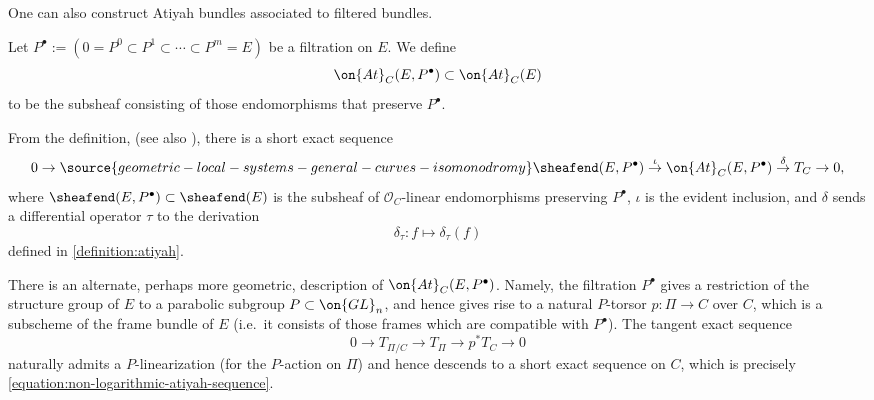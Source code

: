 One can also construct Atiyah bundles associated to filtered bundles.
\begin{definition}
\notready
	\label{definition:atiyah-filtered}
Let $P^\bullet := (0 = P^0 \subset P^1
\subset \cdots \subset P^m = E)$ be a filtration on $E$.
We define $$\on{At}_C(E, P^\bullet)\subset \on{At}_C(E)$$ to be the subsheaf
consisting of those endomorphisms that preserve $P^\bullet$.
\end{definition}



\begin{remark}
\notready
	\label{remark:atiyah-exact-sequence}
	From the definition, (see also \cite[(2.7)]{BHH:logarithmic}), there is a
short exact sequence
\begin{equation} \label{equation:non-logarithmic-atiyah-sequence} 0\to
\source{geometric-local-systems-general-curves-isomonodromy}
	\sheafend(E, P^\bullet)\overset{\iota}{\to} \on{At}_C(E,
P^\bullet)\overset{\delta}{\to} T_C\to 0,\end{equation} where
$\sheafend(E, P^\bullet)\subset \sheafend(E)$ is the subsheaf of $\mathscr{O}_C$-linear endomorphisms preserving $P^\bullet$, $\iota$ is the evident inclusion,
and $\delta$ sends a differential operator $\tau$ to the derivation
$$\delta_\tau: f\mapsto \delta_\tau(f)$$ defined in
\autoref{definition:atiyah}.
\end{remark}

\begin{remark}
\notready
    There is an alternate, perhaps more geometric, description of $\on{At}_C(E,
    P^\bullet)$. Namely, the filtration $P^\bullet$ gives a restriction of
    the structure group of ${E}$ to a parabolic subgroup ${P}\subset
    \on{GL}_n$, and hence gives rise to a natural ${P}$-torsor $p:\Pi\to C$
    over $C$, which is a subscheme of the frame bundle of ${E}$ (i.e.~it
    consists of those frames which are compatible with $P^\bullet$). The tangent
    exact sequence $$0\to T_{\Pi/C}\to T_\Pi\to p^*T_C\to 0$$ naturally admits a ${P}$-linearization (for the ${P}$-action on $\Pi$)
    and hence descends to a short exact sequence on
    $C$, which is precisely \eqref{equation:non-logarithmic-atiyah-sequence}.
\end{remark}

